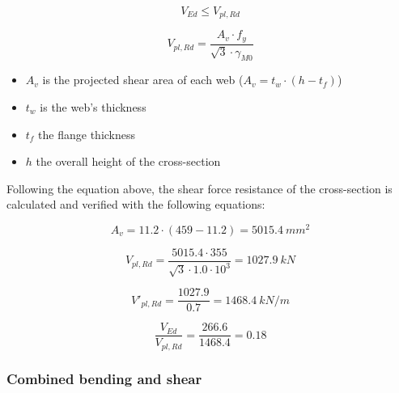 \begin{equation}
    V_{Ed} \leq V_{pl,Rd}
    \label{eq:shear_plastic}
\end{equation}

\begin{equation}
    V_{pl,Rd} = \frac{A_v \cdot f_{y}}{\sqrt{3} \cdot \gamma_{M0}}
    \label{eq:shear_verification}
\end{equation}

\begin{itemize}
    \item $A_{v}$ is the projected shear area of each web ($A_{v} = t_w \cdot (h-t_f)$)
    \item $t_w$ is the web’s thickness
    \item $t_f$ the flange thickness
    \item $h$ the overall height of the cross-section
\end{itemize}

Following the equation above, the shear force resistance of the cross-section is calculated and verified with the following equations:

\begin{equation}
    A_v = 11.2 \cdot (459 - 11.2) = 5015.4 \ mm^2
\end{equation}

\begin{equation}
    V_{pl,Rd} = \frac{5015.4 \cdot 355}{\sqrt{3} \cdot 1.0 \cdot 10^3} = 1027.9 \ kN 
\end{equation}

\begin{equation}
    V'_{pl,Rd} = \frac{1027.9}{0.7} = 1468.4 \ kN/m 
\end{equation}

\begin{equation}
    \frac{V_{Ed}}{V_{pl,Rd}} = \frac{266.6}{1468.4} = 0.18 
\end{equation}



\subsubsection{Combined bending and shear}

